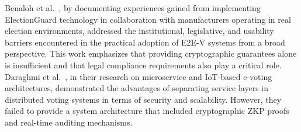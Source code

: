 \documentclass[a4paper,fleqn]{cas-sc}
\begin{document}

Benaloh et al.~\cite{EAC2022}, by documenting experiences gained from implementing ElectionGuard technology in collaboration with manufacturers operating in real election environments, addressed the institutional, legislative, and usability barriers encountered in the practical adoption of E2E-V systems from a broad perspective. This work emphasizes that providing cryptographic guarantees alone is insufficient and that legal compliance requirements also play a critical role. Daraghmi et al.~\cite{Daraghmi2025}, in their research on microservice and IoT-based e-voting architectures, demonstrated the advantages of separating service layers in distributed voting systems in terms of security and scalability. However, they failed to provide a system architecture that included cryptographic ZKP proofs and real-time auditing mechanisms.

\end{document}
